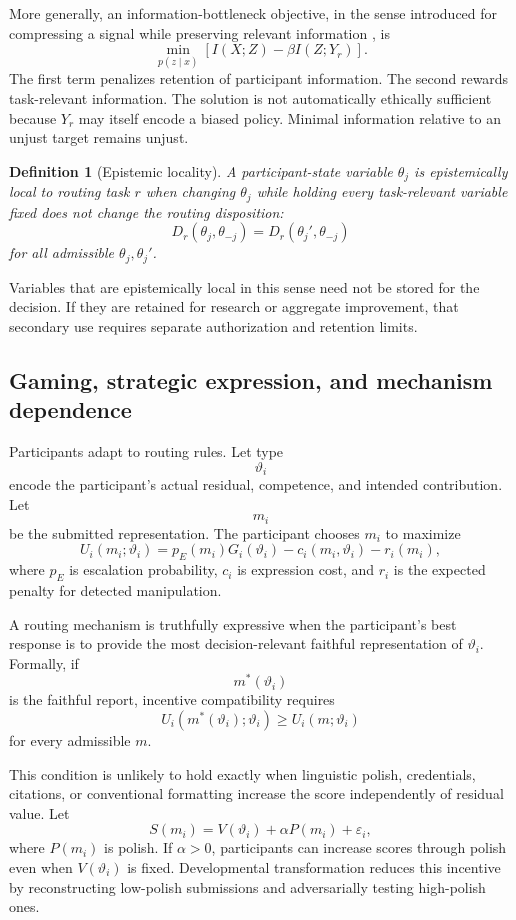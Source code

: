 \documentclass[11pt]{article}
\newtheorem{definition}{Definition}[section]
\theoremstyle{definition}
\begin{document}
More generally, an information-bottleneck objective, in the sense introduced for compressing a signal while preserving relevant information \cite{tishby1999}, is
\[
\min_{p(z\mid x)}
\left[
I(X;Z)-\beta I(Z;Y_r)
\right].
\]
The first term penalizes retention of participant information. The second rewards task-relevant information. The solution is not automatically ethically sufficient because \(Y_r\) may itself encode a biased policy. Minimal information relative to an unjust target remains unjust.

\begin{definition}[Epistemic locality]
A participant-state variable \(\theta_j\) is epistemically local to routing task \(r\) when changing \(\theta_j\) while holding every task-relevant variable fixed does not change the routing disposition:
\[
D_r(\theta_j,\theta_{-j})
=
D_r(\theta_j',\theta_{-j})
\]
for all admissible \(\theta_j,\theta_j'\).
\end{definition}

Variables that are epistemically local in this sense need not be stored for the decision. If they are retained for research or aggregate improvement, that secondary use requires separate authorization and retention limits.

\subsection{Gaming, strategic expression, and mechanism dependence}

Participants adapt to routing rules. Let type
\[
\vartheta_i
\]
encode the participant's actual residual, competence, and intended contribution. Let
\[
m_i
\]
be the submitted representation. The participant chooses \(m_i\) to maximize
\[
U_i(m_i;\vartheta_i)
=
p_E(m_i)G_i(\vartheta_i)
-
c_i(m_i,\vartheta_i)
-
r_i(m_i),
\]
where \(p_E\) is escalation probability, \(c_i\) is expression cost, and \(r_i\) is the expected penalty for detected manipulation.

A routing mechanism is truthfully expressive when the participant's best response is to provide the most decision-relevant faithful representation of \(\vartheta_i\). Formally, if
\[
m^{*}(\vartheta_i)
\]
is the faithful report, incentive compatibility requires
\[
U_i(m^{*}(\vartheta_i);\vartheta_i)
\geq
U_i(m;\vartheta_i)
\]
for every admissible \(m\).

This condition is unlikely to hold exactly when linguistic polish, credentials, citations, or conventional formatting increase the score independently of residual value. Let
\[
S(m_i)
=
V(\vartheta_i)
+
\alpha P(m_i)
+
\varepsilon_i,
\]
where \(P(m_i)\) is polish. If \(\alpha>0\), participants can increase scores through polish even when \(V(\vartheta_i)\) is fixed. Developmental transformation reduces this incentive by reconstructing low-polish submissions and adversarially testing high-polish ones.
\end{document}
